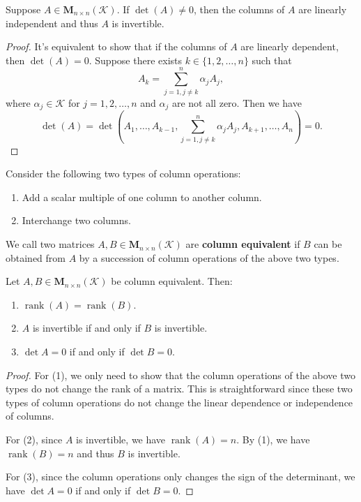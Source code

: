 \documentclass{ctexart}
\newcommand{\M}{\mathbf{M}}
\begin{document}
    \begin{mythm}
        Suppose $A\in \mathbf{M}_{n \times n}(\mathcal{K})$. If $\det(A) \neq 0$, then the columns of $A$ are linearly independent and thus $A$ is invertible.
    \end{mythm}
    \begin{proof}
        It's equivalent to show that if the columns of $A$ are linearly dependent, then $\det(A) = 0$. Suppose there exists $k\in \{1,2,\ldots,n\}$ such that 
        \[
        A_k = \sum_{j=1, j\neq k}^n \alpha_j A_j,
        \]
        where $\alpha_j \in \mathcal{K}$ for $j=1,2,\ldots,n$ and $\alpha_j$ are not all zero. Then we have
        \[
        \det(A) = \det(A_1, \ldots, A_{k-1}, \sum_{j=1, j\neq k}^n \alpha_j A_j, A_{k+1}, \ldots, A_n) = 0.
        \]
    \end{proof}
    \begin{mydef}
        Consider the following two types of column operations:
        \begin{enumerate}
            \item Add a scalar multiple of one column to another column.
            \item Interchange two columns.
        \end{enumerate}
        We call two matrices $A,B \in \M_{n \times n}(\mathcal{K})$ are \textbf{column equivalent} if $B$ can be obtained from $A$ by a succession of column operations of the above two types.
    \end{mydef}
    \begin{mythm}
            Let $A,B \in \M_{n \times n}(\mathcal{K})$ be column equivalent. Then:
            \begin{enumerate}
                \item $\operatorname{rank} (A) = \operatorname{rank}(B)$.
                \item $A$ is invertible if and only if $B$ is invertible.
                \item $\det A = 0$ if and only if $\det B = 0$.
            \end{enumerate}
    \end{mythm}
    \begin{proof}
        For (1), we only need to show that the column operations of the above two types do not change the rank of a matrix. This is straightforward since these two types of column operations do not change the linear dependence or independence of columns.

        For (2), since $A$ is invertible, we have $\operatorname{rank}(A) = n$. By (1), we have $\operatorname{rank}(B) = n$ and thus $B$ is invertible.

        For (3), since the column operations only changes the sign of the determinant, we have $\det A = 0$ if and only if $\det B = 0$.
    \end{proof}
\end{document}
